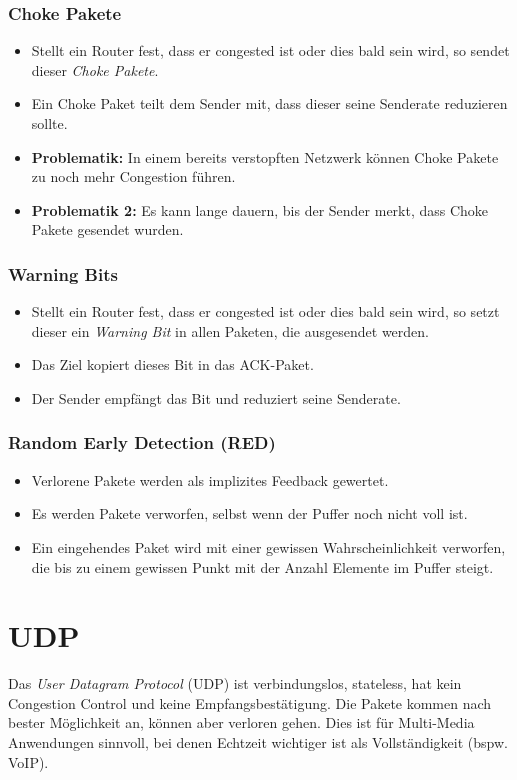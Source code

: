 			\subsubsection{Choke Pakete}
				\begin{itemize}
					\item Stellt ein Router fest, dass er congested ist oder dies bald sein wird, so sendet dieser \textit{Choke Pakete}.
					\item Ein Choke Paket teilt dem Sender mit, dass dieser seine Senderate reduzieren sollte.
					\item \textbf{Problematik:} In einem bereits verstopften Netzwerk können Choke Pakete zu noch mehr Congestion führen.
					\item \textbf{Problematik 2:} Es kann lange dauern, bis der Sender merkt, dass Choke Pakete gesendet wurden.
				\end{itemize}

			\subsubsection{Warning Bits}
				\begin{itemize}
					\item Stellt ein Router fest, dass er congested ist oder dies bald sein wird, so setzt dieser ein \textit{Warning Bit} in allen Paketen, die ausgesendet werden.
					\item Das Ziel kopiert dieses Bit in das ACK-Paket.
					\item Der Sender empfängt das Bit und reduziert seine Senderate.
				\end{itemize}

			\subsubsection{Random Early Detection (RED)}
				\begin{itemize}
					\item Verlorene Pakete werden als implizites Feedback gewertet.
					\item Es werden Pakete verworfen, selbst wenn der Puffer noch nicht voll ist.
					\item Ein eingehendes Paket wird mit einer gewissen Wahrscheinlichkeit verworfen, die bis zu einem gewissen Punkt mit der Anzahl Elemente im Puffer steigt.
				\end{itemize}

	\section{UDP}
		Das \textit{User Datagram Protocol} (UDP) ist verbindungslos, stateless, hat kein Congestion Control und keine Empfangsbestätigung. Die Pakete kommen nach bester Möglichkeit an, können aber verloren gehen. Dies ist für Multi-Media Anwendungen sinnvoll, bei denen Echtzeit wichtiger ist als Vollständigkeit (bspw. VoIP).

